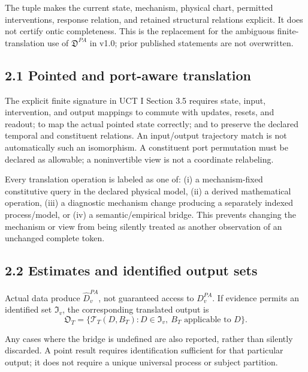 \documentclass[
  11pt,
  a4paper,
]{article}
\begin{document}
The tuple makes the current state, mechanism, physical chart, permitted
interventions, response relation, and retained structural relations
explicit. It does not certify ontic completeness. This is the
replacement for the ambiguous finite-translation use of
\(\mathfrak D^{PA}\) in v1.0; prior published statements are not
overwritten.

\hypertarget{pointed-and-port-aware-translation}{%
\subsection{2.1 Pointed and port-aware
translation}\label{pointed-and-port-aware-translation}}

The explicit finite signature in UCT I Section 3.5 requires state,
input, intervention, and output mappings to commute with updates,
resets, and readout; to map the actual pointed state correctly; and to
preserve the declared temporal and constituent relations. An
input/output trajectory match is not automatically such an isomorphism.
A constituent port permutation must be declared as allowable; a
noninvertible view is not a coordinate relabeling.

Every translation operation is labeled as one of: (i) a mechanism-fixed
constitutive query in the declared physical model, (ii) a derived
mathematical operation, (iii) a diagnostic mechanism change producing a
separately indexed process/model, or (iv) a semantic/empirical bridge.
This prevents changing the mechanism or view from being silently treated
as another observation of an unchanged complete token.

\hypertarget{estimates-and-identified-output-sets}{%
\subsection{2.2 Estimates and identified output
sets}\label{estimates-and-identified-output-sets}}

Actual data produce \(\widehat D^{PA}_v\), not guaranteed access to
\(D^{PA}_v\). If evidence permits an identified set \(\mathfrak I_v\),
the corresponding translated output is
\nopagebreak[4]
\[
\mathfrak O_T=
\{\mathcal T_T(D,B_T):D\in\mathfrak I_v,\ B_T\text{ applicable to }D\}.
\]

Any cases where the bridge is undefined are also reported, rather than
silently discarded. A point result requires identification sufficient
for that particular output; it does not require a unique universal
process or subject partition.
\end{document}
